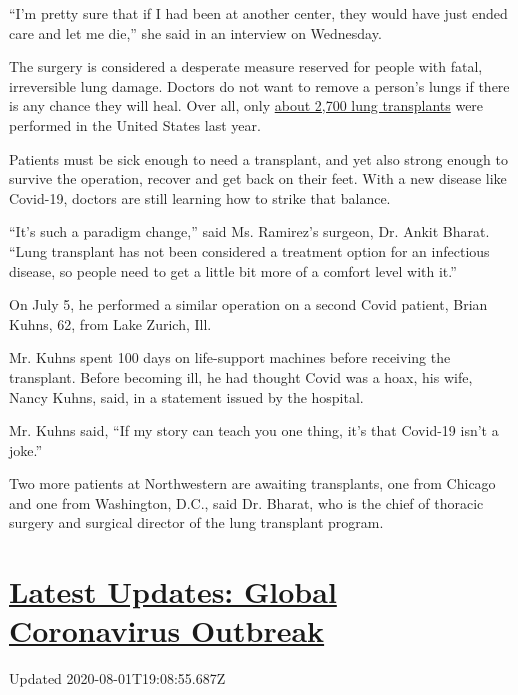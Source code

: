 ``I'm pretty sure that if I had been at another center, they would have
just ended care and let me die,'' she said in an interview on Wednesday.

The surgery is considered a desperate measure reserved for people with
fatal, irreversible lung damage. Doctors do not want to remove a
person's lungs if there is any chance they will heal. Over all, only
\href{https://unos.org/data/transplant-trends/}{about 2,700 lung
transplants} were performed in the United States last year.

Patients must be sick enough to need a transplant, and yet also strong
enough to survive the operation, recover and get back on their feet.
With a new disease like Covid-19, doctors are still learning how to
strike that balance.

``It's such a paradigm change,'' said Ms. Ramirez's surgeon, Dr. Ankit
Bharat. ``Lung transplant has not been considered a treatment option for
an infectious disease, so people need to get a little bit more of a
comfort level with it.''

On July 5, he performed a similar operation on a second Covid patient,
Brian Kuhns, 62, from Lake Zurich, Ill.

Mr. Kuhns spent 100 days on life-support machines before receiving the
transplant. Before becoming ill, he had thought Covid was a hoax, his
wife, Nancy Kuhns, said, in a statement issued by the hospital.

Mr. Kuhns said, ``If my story can teach you one thing, it's that
Covid-19 isn't a joke.''

Two more patients at Northwestern are awaiting transplants, one from
Chicago and one from Washington, D.C., said Dr. Bharat, who is the chief
of thoracic surgery and surgical director of the lung transplant
program.

\hypertarget{latest-updates-global-coronavirus-outbreak}{%
\section{\texorpdfstring{\href{https://www.nytimes3xbfgragh.onion/2020/08/01/world/coronavirus-covid-19.html?action=click\&pgtype=Article\&state=default\&region=MAIN_CONTENT_1\&context=storylines_live_updates}{Latest
Updates: Global Coronavirus
Outbreak}}{Latest Updates: Global Coronavirus Outbreak}}\label{latest-updates-global-coronavirus-outbreak}}

Updated 2020-08-01T19:08:55.687Z

